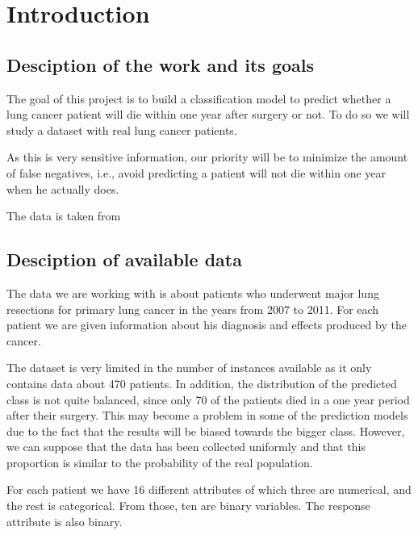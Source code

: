 \section{Introduction}

\subsection{Desciption of the work and its goals}

The goal of this project is to build a classification model to predict whether
a lung cancer patient will die within one year after surgery or not. To do so
we will study a dataset with real lung cancer patients.

As this is very sensitive information, our priority will be to minimize the
amount of false negatives, i.e., avoid predicting a patient will not die within
one year when he actually does.

The data is taken from
\cite{zieba2013boosted}

\subsection{Desciption of available data}

The data we are working with is about patients who underwent major lung
resections for primary lung cancer in the years from 2007 to 2011. For each
patient we are given information about his diagnosis and effects produced
by the cancer.

The dataset is very limited in the number of instances available as it only contains
data about 470 patients. In addition, the distribution of the predicted class is not quite
balanced,
since only 70 of the patients died in a one year period after their surgery. This may
become a problem in some of the prediction models due to the fact that the results
will be biased towards the bigger class. However, we can suppose that the data has been
collected uniformly and that this proportion is similar to the probability of the real population.

For each patient we have 16 different attributes of which three are numerical, and
the rest is categorical. From those, ten are binary variables. The response attribute is
also binary.

